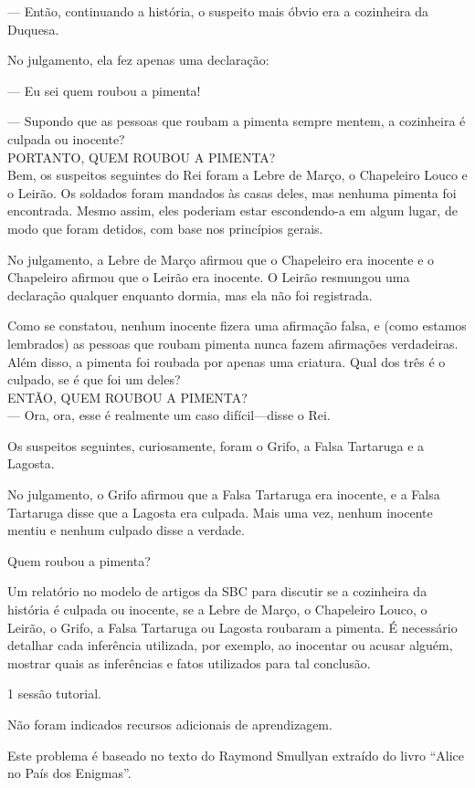 --- Então, continuando a história, o suspeito mais óbvio era a cozinheira da Duquesa.

No julgamento, ela fez apenas uma declaração:

--- Eu sei quem roubou a pimenta!

--- Supondo que as pessoas que roubam a pi\-men\-ta sempre mentem, a cozinheira é culpada ou inocente?\\

PORTANTO, QUEM ROUBOU A PIMENTA?\\

Bem, os suspeitos seguintes do Rei foram a Lebre de Março, o Chapeleiro Louco e o Leirão. Os soldados foram mandados às casas deles, mas nenhuma pimenta foi encontrada. Mesmo assim, eles poderiam estar escondendo-a em algum lugar, de modo que foram detidos, com base nos princípios gerais.

No julgamento, a Lebre de Março afirmou que o Chapeleiro era inocente e o Chapeleiro afirmou que o Leirão era inocente. O Leirão resmungou uma declaração qualquer enquanto dormia, mas ela não foi registrada.

Como se constatou, nenhum inocente fizera uma afirmação falsa, e (como estamos lembrados) as pessoas que roubam pimenta nunca fazem afirmações verdadeiras. Além disso, a pimenta foi roubada por apenas uma criatura. Qual dos três é o culpado, se é que foi um deles?\\

ENTÃO, QUEM ROUBOU A PIMENTA?\\

--- Ora, ora, esse é realmente um caso difícil---disse o Rei.

Os suspeitos seguintes, curiosamente, foram o Grifo, a Falsa Tartaruga e a Lagosta.

No julgamento, o Grifo afirmou que a Falsa Tartaruga era inocente, e a Falsa Tartaruga disse que a Lagosta era culpada.
Mais uma vez, nenhum inocente mentiu e nenhum culpado disse a verdade.

Quem roubou a pimenta?

Um relatório no modelo de artigos da SBC para discutir se a cozinheira da história é culpada ou
inocente, se a Lebre de Março, o Chapeleiro Louco, o Leirão, o Grifo, a Falsa Tartaruga ou Lagosta
roubaram a pimenta.
É necessário detalhar cada inferência utilizada, por exemplo, ao inocentar ou acusar alguém, mostrar
quais as inferências e fatos utilizados para tal conclusão.

1 sessão tutorial.

Não foram indicados recursos adicionais de aprendizagem.

Este problema é baseado no texto do Raymond Smullyan extraído do livro ``Alice no País dos Enigmas''.
